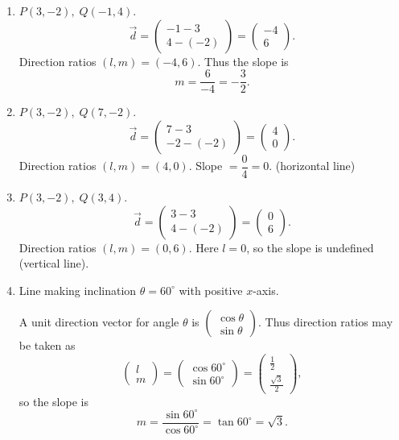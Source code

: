 \documentclass[journal]{IEEEtran}
\begin{document}
\begin{enumerate}
\item \(P(3,-2),\;Q(-1,4)\).
\[
\vec{d}=\begin{pmatrix}-1-3\\[4pt]4-(-2)\end{pmatrix}=\begin{pmatrix}-4\\[4pt]6\end{pmatrix}.
\]
Direction ratios \((l,m)=(-4,6)\). Thus the slope is
\[
m=\frac{6}{-4}=-\frac{3}{2}.
\]

\item \(P(3,-2),\;Q(7,-2)\).
\[
\vec{d}=\begin{pmatrix}7-3\\[4pt]-2-(-2)\end{pmatrix}=\begin{pmatrix}4\\[4pt]0\end{pmatrix}.
\]
Direction ratios \((l,m)=(4,0)\). Slope \(=\dfrac{0}{4}=0\). (horizontal line)

\item \(P(3,-2),\;Q(3,4)\).
\[
\vec{d}=\begin{pmatrix}3-3\\[4pt]4-(-2)\end{pmatrix}=\begin{pmatrix}0\\[4pt]6\end{pmatrix}.
\]
Direction ratios \((l,m)=(0,6)\). Here \(l=0\), so the slope is undefined (vertical line).

\item Line making inclination \(\theta=60^\circ\) with positive \(x\)-axis.

A unit direction vector for angle \(\theta\) is 
\(\begin{pmatrix}\cos\theta\\[4pt]\sin\theta\end{pmatrix}\).  
Thus direction ratios may be taken as
\[
\begin{pmatrix}l\\[4pt]m\end{pmatrix}=\begin{pmatrix}\cos60^\circ\\[4pt]\sin60^\circ\end{pmatrix}=\begin{pmatrix}\tfrac{1}{2}\\[4pt]\tfrac{\sqrt3}{2}\end{pmatrix},
\]
so the slope is
\[
m=\frac{\sin60^\circ}{\cos60^\circ}=\tan60^\circ=\sqrt{3}.
\]
\end{enumerate}
\end{document}
